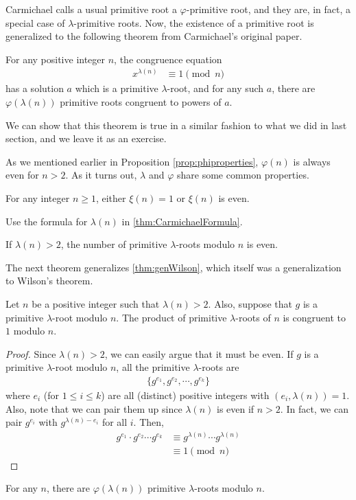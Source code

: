 Carmichael calls a usual primitive root a $\varphi$-primitive root, and they are, in fact, a special case of $\lambda$-primitive roots. Now, the existence of a primitive root is generalized to the following theorem from Carmichael's original paper.
\begin{theorem}
	For any positive integer $n$, the congruence equation
		\begin{align*}
			x^{\lambda(n)} & \equiv1\pmod n
		\end{align*}
	has a solution $a$ which is a primitive $\lambda$-root, and for any such $a$, there are $\varphi(\lambda(n))$ primitive roots congruent to powers of $a$.
\end{theorem}
We can show that this theorem is true in a similar fashion to what we did in last section, and we leave it as an exercise.

As we mentioned earlier in Proposition \ref{prop:phiproperties}, $\varphi(n)$ is always even for $n>2$. As it turns out, $\lambda$ and $\varphi$ share some common properties.
\begin{problem}
	For any integer $n\geq 1$, either $\xi(n)=1$ or $\xi(n)$ is even.
\end{problem}

\begin{hint}
	Use the formula for $\lambda(n)$ in \autoref{thm:CarmichaelFormula}.
\end{hint}

\begin{problem}
	If $\lambda(n)>2$, the number of primitive $\lambda$-roots modulo $n$ is even.
\end{problem}

The next theorem generalizes \autoref{thm:genWilson}, which itself was a generalization to Wilson's theorem.
\begin{theorem}
	Let $n$ be a positive integer such that $\lambda(n)>2$. Also, suppose that $g$ is a primitive $\lambda$-root modulo $n$. The product of primitive $\lambda$-roots of $n$ is congruent to $1$ modulo $n$.
\end{theorem}

\begin{proof}
	Since $\lambda(n)>2$, we can easily argue that it must be even. If $g$ is a primitive $\lambda$-root modulo $n$, all the primitive $\lambda$-roots are
		\begin{align*}
			\{g^{e_1}, g^{e_2}, \cdots, g^{e_{k}}\}
		\end{align*}
	where $e_i$ (for $1 \leq i \leq k$) are all (distinct) positive integers with $(e_i, \lambda(n))=1$. Also, note that we can pair them up since $\lambda(n)$ is even if $n>2$. In fact, we can pair $g^{e_i}$ with $g^{\lambda(n)-e_i}$ for all $i$. Then,
	\begin{align*}
		g^{e_1}\cdot g^{e_2}\cdots g^{e_k}
			& \equiv g^{\lambda(n)}\cdots g^{\lambda(n)}\\
			& \equiv 1\pmod n
	\end{align*}
\end{proof}

\begin{corollary}
	For any $n$, there are $\varphi(\lambda(n))$ primitive $\lambda$-roots modulo $n$.
\end{corollary}

